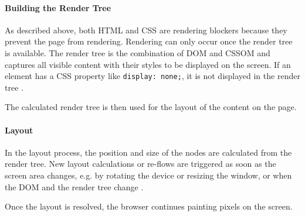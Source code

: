 




\paragraph{Building the Render Tree} %

As described above, both HTML and CSS are rendering blockers because they prevent the page from rendering.
Rendering can only occur once the render tree is available.
The render tree is the combination of DOM and CSSOM and captures all visible content with their styles to be displayed on the screen.
If an element has a CSS property like \verb|display: none;|, it is not displayed in the render tree \cite{2019GrigorikRenderTree}.

The calculated render tree is then used for the layout of the content on the page.





\paragraph{Layout} %

In the layout process, the position and size of the nodes are calculated from the render tree.
New layout calculations or re-flows are triggered as soon as the screen area changes, e.g. by rotating the device or resizing the window, or when the DOM and the render tree change \cite{2021MDNHowBrowsersWork}.

Once the layout is resolved, the browser continues painting pixels on the screen.





